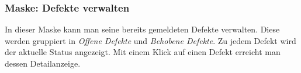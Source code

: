 \begin{figure}[H]
\hfill
{}
\end{figure}

\subsubsection{Maske: Defekte verwalten}
In dieser Maske kann man seine bereits gemeldeten Defekte verwalten. Diese werden gruppiert in \emph{Offene Defekte} und \emph{Behobene Defekte}. Zu jedem Defekt wird der aktuelle Status angezeigt. Mit einem Klick auf einen Defekt erreicht man dessen Detailanzeige.


